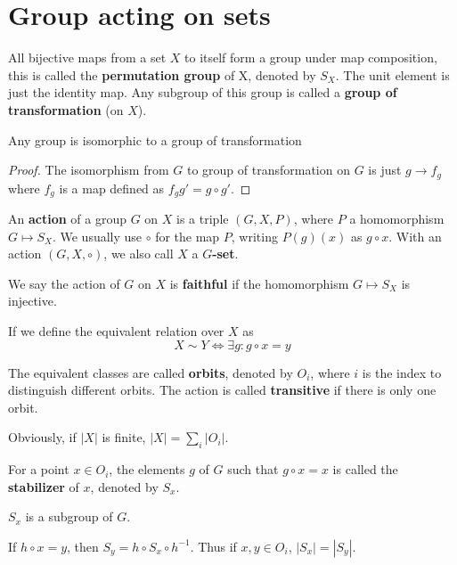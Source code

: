 \documentclass[12pt]{book}
\begin{document}
	\section{Group acting on sets}
\begin{definition}
	All bijective maps from a set $X$ to itself form a group under map composition, this is called the \textbf{permutation group} of X, denoted by $S_X$. The unit element is just the identity map. Any subgroup of this group is called a \textbf{group of transformation} (on $X$).
\end{definition}
\begin{theorem}[Cayley]
	 Any group is isomorphic to a group of transformation
\end{theorem}
\begin{proof}
	The isomorphism from $G$ to group of transformation on $G$ is just $g\rightarrow f_g$ where $f_g$ is a map defined as $f_gg'=g\circ g'$.
\end{proof}
	
\begin{definition}
	An {\bf action} of a group $G$ on $X$ is a triple $(G,X,P)$, where $P$ a homomorphism $G\mapsto S_X$. We usually use $\circ$ for the map $P$, writing $P(g)(x)$ as $g\circ x$. With an action $(G,X,\circ)$, we also call $X$ a {\bf $G$-set}.
\end{definition}

\begin{definition}
	We say the action of $G$ on $X$ is {\bf faithful} if the homomorphism $G\mapsto S_X$ is injective.
\end{definition}
	
\begin{definition}
	If we define the equivalent relation over $X$ as
	\begin{equation}
		X\sim Y \iff\exists g:g\circ x=y
	\end{equation}
		
	The equivalent classes are called \textbf{orbits}, denoted by $O_i$, where $i$ is the index to distinguish different orbits. The action is called \textbf{transitive} if there is only one orbit. 
	
	Obviously, if $|X|$ is finite, $|X|=\sum_i|O_i|$.
\end{definition}
	
\begin{definition}
	For a point $x\in O_i$, the elements $g$ of $G$ such that $g\circ x=x$ is called the \textbf{stabilizer} of $x$, denoted by $S_x$.
\end{definition}
	\begin{lemma}
		$S_x$ is a subgroup of $G$.
	\end{lemma}
	\begin{lemma}
		If $h\circ x=y$, then $S_y=h\circ S_x \circ h^{-1}$. Thus if $x,y\in O_i$, $|S_x|=|S_y|$.
	\end{lemma}
	
\end{document}
